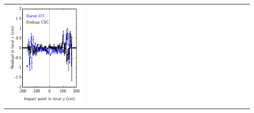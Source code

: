 \documentclass[compress]{beamer}
\begin{document}
\begin{frame}
\begin{center}
\begin{tabular}{p{0.33\linewidth} p{0.33\linewidth} p{0.33\linewidth}}
\begin{minipage}{\linewidth}
	\includegraphics[width=\linewidth]{init_xresid_vs_y}
      \end{minipage} &
      \begin{minipage}{\linewidth}
	\hspace{-0.7 cm}

\end{minipage}
\end{tabular}
\end{center}
\end{frame}
\end{document}

